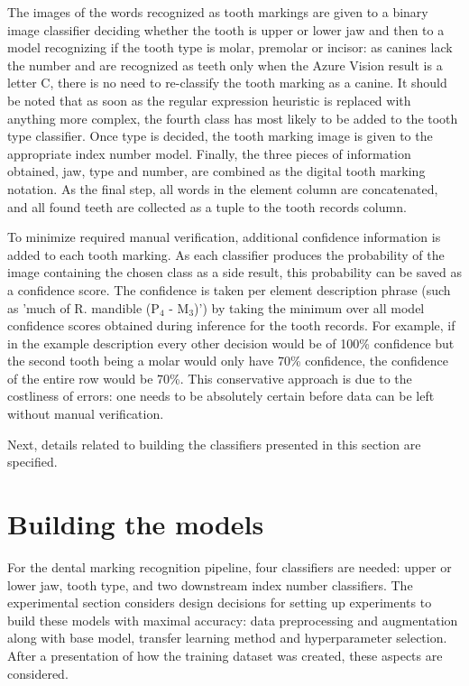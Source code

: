 \documentclass[english,twoside,openright]{UH_DS_MSc}
\begin{document}
The images of the words recognized as tooth markings are given to a binary image classifier deciding whether the tooth 
is upper or lower jaw and then to a model recognizing if the tooth type is molar, premolar or incisor: as 
canines lack the number and are recognized as teeth only when the Azure Vision result is a letter C, there is 
no need to re-classify the tooth marking as a canine. It should be noted that as soon as the regular expression
heuristic is replaced with anything more complex, the fourth class has most likely to be added to the tooth type classifier.
Once type is decided, the tooth marking image is given to the appropriate index number model. Finally, 
the three pieces of information obtained, jaw, type and number, are combined as the digital tooth marking 
notation. As the final step, all words in the element column are concatenated, and all found teeth are 
collected as a tuple to the tooth records column.

To minimize required manual verification, additional confidence information is added 
to each tooth marking. As each classifier produces the probability of the image containing the 
chosen class as a side result, this probability can be saved as a confidence score. The confidence is taken 
per element description phrase (such as 'much of R. mandible ($\text{P}_4$ - $\text{M}_3$)') by taking the minimum over all 
model confidence scores obtained during inference for the tooth records. For example, if in the 
example description every other decision would be of 100\% confidence but the second tooth being a molar 
would only have 70\% confidence, the confidence of the entire row would be 70\%. This conservative approach is 
due to the costliness of errors: one needs to be absolutely certain before data can be left without manual 
verification.

Next, details related to building the classifiers presented in this section are specified.

\section{Building the models}
\label{sect:building-models}


For the dental marking recognition pipeline, four classifiers are needed: upper or lower jaw, 
tooth type, and two downstream index number classifiers. The experimental 
section considers design decisions for setting up experiments to build these models with maximal accuracy:
 data preprocessing and augmentation along with base model,
transfer learning method and hyperparameter selection. After a presentation of  how the training dataset was created, these aspects are considered.
\end{document}
